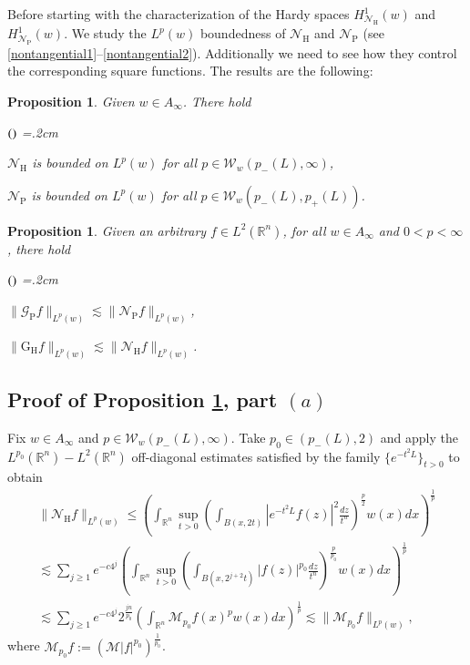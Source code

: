 \documentclass[11pt, a4paper,leqno]{amsart}
\theoremstyle{plain}
\newtheorem{proposition}[equation]{Proposition}
\theoremstyle{definition}
\theoremstyle{remark}
\numberwithin{equation}{section}
\def \R{ \mathbb{R} }
\def \hh{ \mathrm{H} }
\def \pp{ \mathrm{P} }
\def \Gcal { \mathcal{G} }
\def \Grm{ \mathrm{G} }
\def \Ncal { \mathcal{N} }
\begin{document}
Before starting with the characterization of the Hardy spaces $H^1_{\Ncal_{\hh}}(w)$ and $H^1_{\Ncal_{\pp}}(w)$. We study the $L^p(w)$ boundedness of $\Ncal_{\hh}$ and $\Ncal_{\pp}$ (see \eqref{nontangential1}--\eqref{nontangential2}). Additionally we need to see how they control  the corresponding square functions. The results are the following:
%
\begin{proposition}\label{prop:acotacion-N}
Given $w\in A_{\infty}$. There hold
\begin{list}{$(\theenumi)$}{\leftmargin=1cm \itemsep=0.2cm\topsep=.2cm \renewcommand{\theenumi}{\alph{enumi}}}

\item $
\Ncal_{\hh}$  is bounded on $L^p(w)
$ for all $p\in \mathcal{W}_w(p_-(L),\infty)$,

\item $\Ncal_{\pp}$  is bounded on $L^p(w)
$ for all $p\in \mathcal{W}_w(p_-(L),p_+(L))$.
\end{list}

\end{proposition}
%
\begin{proposition}\label{prop:comparacion-N-G}
Given an arbitrary $f\in L^2(\mathbb{R}^n)$, for all $w\in A_{\infty}$ and $0<p<\infty$, there hold
\begin{list}{$(\theenumi)$}{\leftmargin=1cm \itemsep=0.2cm\topsep=.2cm \renewcommand{\theenumi}{\alph{enumi}}}
\item $
\|\Gcal_{\pp}f\|_{L^p(w)}\lesssim  \|\Ncal_{\pp}f\|_{L^p(w)}$,

\item
$
\|\Grm_{\hh}f\|_{L^p(w)}\lesssim  \|\Ncal_{\hh}f\|_{L^p(w)}$.
\end{list}
\end{proposition}




\subsection{Proof of Proposition \ref{prop:acotacion-N}, part $(a)$}
Fix $w\in A_{\infty}$ and $p\in \mathcal{W}_w(p_-(L),\infty)$. Take
$p_0\in (p_-(L),2)$ and apply the $L^{p_0}(\R^n)-L^2(\R^n)$ off-diagonal estimates satisfied by the family $\{e^{-t^2L}\}_{t>0}$ to obtain
\begin{multline*}
    \|\Ncal_{\hh}f\|_{L^p(w)}    
    \leq\left(\int_{\R^n}\sup_{t>0}\left(\int_{B(x, 2 t)}
    |e^{-t^2L}f(z)|^2\frac{dz}{t^n}\right)^{\frac{p}{2}}
    w(x)dx\right)^{\frac{1}{p}}
    \\
\lesssim \sum_{j\geq
1}e^{-c4^{j}}\left(\int_{\R^n}\sup_{t>0}\left(\int_{B(x,2^{j+2}
 t)}
    |f(z)|^{p_0}\frac{dz}{  t^n}\right)^{\frac{p}{p_0}}
    w(x)dx\right)^{\frac{1}{p}}
    \\
  \lesssim \sum_{j\geq
1}e^{-c4^{j}}2^{\frac{jn}{p_0}}
\left(\int_{\R^n}\mathcal{M}_{p_0}f(x)^p
    w(x)dx\right)^{\frac{1}{p}}
   \lesssim \|\mathcal{M}_{p_0}f\|_{L^p(w)},
\end{multline*}
where  $\mathcal{M}_{p_0}f:=(\mathcal{M}|f|^{p_0})^{\frac{1}{p_0}}$.
\end{document}
